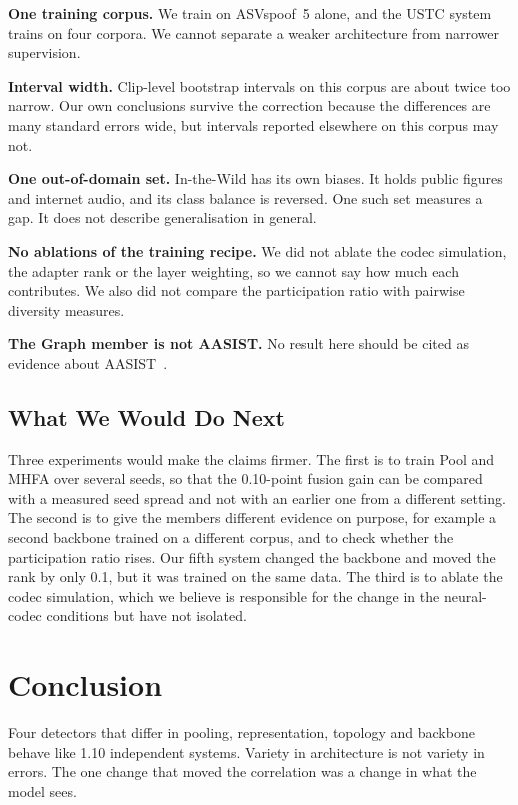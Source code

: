 \documentclass[twocolumn,a4paper,11pt]{article}
\begin{document}
\textbf{One training corpus.} We train on ASVspoof~5 alone, and the USTC system~\cite{ustc2024}
trains on four corpora. We cannot separate a weaker architecture from narrower
supervision.

\textbf{Interval width.} Clip-level bootstrap intervals on this corpus are
about twice too narrow. Our own conclusions survive the correction because the
differences are many standard errors wide, but intervals reported elsewhere on
this corpus may not.

\textbf{One out-of-domain set.} In-the-Wild has its own biases. It holds public
figures and internet audio, and its class balance is reversed. One such set
measures a gap. It does not describe generalisation in general.

\textbf{No ablations of the training recipe.} We did not ablate the codec
simulation, the adapter rank or the layer weighting, so we cannot say how much
each contributes. We also did not compare the participation ratio with pairwise
diversity measures.

\textbf{The Graph member is not AASIST.} No result here should be cited as
evidence about AASIST~\cite{aasist}.

\subsection{What We Would Do Next}

Three experiments would make the claims firmer. The first is to train Pool and
MHFA over several seeds, so that the 0.10-point fusion gain can be compared
with a measured seed spread and not with an earlier one from a different
setting. The second is to give the members different evidence on purpose, for
example a second backbone trained on a different corpus, and to check whether
the participation ratio rises. Our fifth system changed the backbone and moved
the rank by only 0.1, but it was trained on the same data. The third is to
ablate the codec simulation, which we believe is responsible for the change
in the neural-codec conditions but have not isolated.

\section{Conclusion}
\label{sec:conclusion}

Four detectors that differ in pooling, representation, topology and backbone
behave like 1.10 independent systems. Variety in architecture is not variety
in errors. The one change that moved the correlation was a change in what the
model sees.
\end{document}
